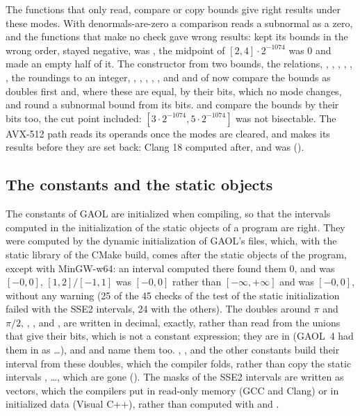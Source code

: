 \documentclass[12pt,a4paper,twoside,openright]{book}
\begin{document}
\medskip
The functions that only read, compare or copy bounds give right results under
these modes. With denormals-are-zero a comparison reads a subnormal as a
zero, and the functions that make no check gave wrong results:
 kept its bounds in the wrong order,
 stayed negative,  was
\code{[-0]}, the midpoint of $[2, 4] \cdot 2^{-1074}$ was 0 and
 made an empty half of it. The constructor from two bounds, the
relations, \code{\&}, \code{|}, , , ,
, the roundings to an integer, , ,
, , , and 
and  of  now compare the bounds as doubles
first and, where these are equal, by their bits, which no mode changes, and
round a subnormal bound from its bits.  and
 compare the bounds by their bits too, the cut point
included: $[3 \cdot 2^{-1074}, 5 \cdot 2^{-1074}]$ was not bisectable. The
AVX-512 path reads its operands once the modes are cleared, and makes its
results before they are set back: Clang 18 computed  after, and
\code{[3e-308] - [2.9e-308]} was \code{[0, 0]} ().

\subsection{The constants and the static objects}
\label{sec:changes-constants}
%

The constants of GAOL are initialized when compiling, so that the intervals
computed in the initialization of the static objects of a program are
right.\newinvfive{} They were computed by the dynamic initialization of
GAOL's files, which, with the static library of the CMake build, comes after
the static objects of the program, except with MinGW-w64: an interval
computed there found them 0, and  was $[-0, 0]$,
$[1, 2]/[-1, 1]$ was $[-0, 0]$ rather than $[-\infty, +\infty]$ and
 was $[-0, 0]$, without any warning (25 of the 45 checks of
the test of the static initialization failed with the SSE2 intervals, 24 with
the others). The doubles around $\pi$ and $\pi/2$, ,
,  and ,
are written in decimal, exactly, rather than read from the unions that give
their bits, which is not a constant expression; they are in 
(GAOL~4 had them in  as \ldots), and  and
 name them too. , ,
 and the other constants build their interval from these
doubles, which the compiler folds, rather than copy the static intervals
, \ldots, which are gone
(). The masks of the SSE2 intervals are written
as vectors, which the compilers put in read-only memory (GCC and Clang) or in
initialized data (Visual C++), rather than computed with 
and .
\end{document}
